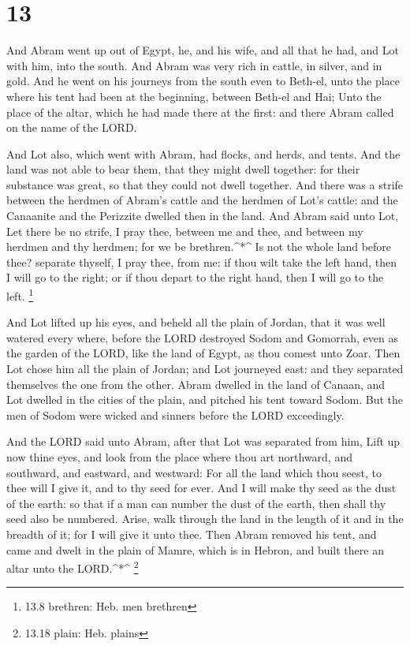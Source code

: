 \hypertarget{section-12}{%
\section{13}\label{section-12}}

 And Abram went up out of Egypt, he, and his wife, and all
that he had, and Lot with him, into the south.  And Abram
was very rich in cattle, in silver, and in gold.  And he
went on his journeys from the south even to Beth-el, unto the place
where his tent had been at the beginning, between Beth-el and Hai;
 Unto the place of the altar, which he had made there at the
first: and there Abram called on the name of the LORD.

 And Lot also, which went with Abram, had flocks, and herds,
and tents.  And the land was not able to bear them, that
they might dwell together: for their substance was great, so that they
could not dwell together.  And there was a strife between
the herdmen of Abram's cattle and the herdmen of Lot's cattle: and the
Canaanite and the Perizzite dwelled then in the land.  And
Abram said unto Lot, Let there be no strife, I pray thee, between me and
thee, and between my herdmen and thy herdmen; for we be
brethren.\^{}*\^{}  Is not the whole land before thee?
separate thyself, I pray thee, from me: if thou wilt take the left hand,
then I will go to the right; or if thou depart to the right hand, then I
will go to the left. \footnote{13.8 brethren: Heb. men brethren}

 And Lot lifted up his eyes, and beheld all the plain of
Jordan, that it was well watered every where, before the LORD destroyed
Sodom and Gomorrah, even as the garden of the LORD, like the land of
Egypt, as thou comest unto Zoar.  Then Lot chose him all
the plain of Jordan; and Lot journeyed east: and they separated
themselves the one from the other.  Abram dwelled in the
land of Canaan, and Lot dwelled in the cities of the plain, and pitched
his tent toward Sodom.  But the men of Sodom were wicked
and sinners before the LORD exceedingly.

 And the LORD said unto Abram, after that Lot was separated
from him, Lift up now thine eyes, and look from the place where thou art
northward, and southward, and eastward, and westward:  For
all the land which thou seest, to thee will I give it, and to thy seed
for ever.  And I will make thy seed as the dust of the
earth: so that if a man can number the dust of the earth, then shall thy
seed also be numbered.  Arise, walk through the land in the
length of it and in the breadth of it; for I will give it unto thee.
 Then Abram removed his tent, and came and dwelt in the
plain of Mamre, which is in Hebron, and built there an altar unto the
LORD.\^{}*\^{} \footnote{13.18 plain: Heb. plains}

